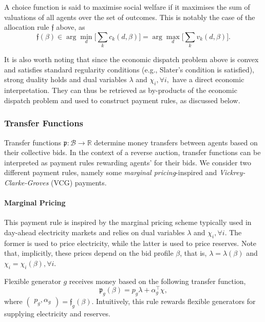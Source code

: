 \documentclass{article}
\begin{document}
A choice function is said to maximise social welfare if it maximises the sum of valuations of all agents over the set of outcomes. This is notably the case of the allocation rule $\mathfrak{f}$ above, as 
\begin{equation*}
\mathfrak{f}(\beta) \in \arg \min_d \bigg[\sum_k c_k(d, \beta)\bigg] = \arg \max_d \bigg[\sum_k v_k(d, \beta) \bigg].
\end{equation*}

It is also worth noting that since the economic dispatch problem above is convex and satisfies standard regularity conditions (e.g., Slater's condition is satisfied), strong duality holds and dual variables $\lambda$ and $\chi_i, \forall i,$ have a direct economic interpretation. They can thus be retrieved as by-products of the economic dispatch problem and used to construct payment rules, as discussed below.

\subsubsection{Transfer Functions}

Transfer functions $\mathfrak{p}: \mathcal{B} \rightarrow \mathbb{R}$ determine money transfers between agents based on their collective bids. In the context of a reverse auction, transfer functions can be interpreted as payment rules rewarding agents' for their bids. We consider two different payment rules, namely some \textit{marginal pricing}-inspired and \textit{Vickrey-Clarke-Groves} (VCG) payments.

\paragraph{Marginal Pricing} This payment rule is inspired by the marginal pricing scheme typically used in day-ahead electricity markets and relies on dual variables $\lambda$ and $\chi_i, \forall i$. The former is used to price electricity, while the latter is used to price reserves. Note that, implicitly, these prices depend on the bid profile $\beta$, that is, $\lambda = \lambda(\beta)$ and $\chi_i = \chi_i(\beta), \forall i$.

Flexible generator $g$ receives money based on the following transfer function,
\begin{equation*}
\mathfrak{p}_g(\beta) = p_g \lambda + \alpha_g^\top \chi,
\end{equation*}
where $\begin{pmatrix} p_g, \alpha_g \end{pmatrix} = \mathfrak{f}_g(\beta)$. Intuitively, this rule rewards flexible generators for supplying electricity and reserves.
\end{document}

